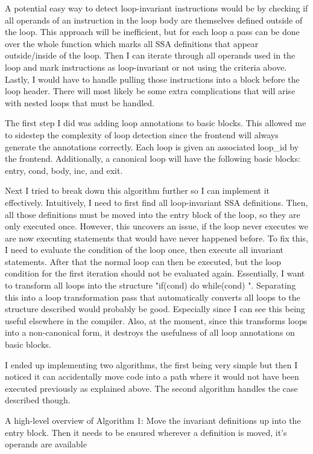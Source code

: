 \documentclass[11pt, a4paper, titlepage]{article}
\begin{document}
A potential easy way to detect loop-invariant instructions would be by checking if all operands of an instruction in the loop body are themselves defined outside of the loop. This approach will be inefficient, but for each loop a pass can be done over the whole function which marks all SSA definitions that appear outside/inside of the loop. Then I can iterate through all operands used in the loop and mark instructions as loop-invariant or not using the criteria above. Lastly, I would have to handle pulling those instructions into a block before the loop header. There will most likely be some extra complications that will arise with nested loops that must be handled.

The first step I did was adding loop annotations to basic blocks.
This allowed me to sidestep the complexity of loop detection since the frontend will always generate the annotations correctly.
Each loop is given an associated loop\_id by the frontend.
Additionally, a canonical loop will have the following basic blocks: entry, cond, body, inc, and exit.

Next I tried to break down this algorithm further so I can implement it effectively. Intuitively, I need to first find all loop-invariant SSA definitions. Then, all those definitions must be moved into the entry block of the loop, so they are only executed once. However, this uncovers an issue, if the loop never executes we are now executing statements that would have never happened before. To fix this, I need to evaluate the condition of the loop once, then execute all invariant statements. After that the normal loop can then be executed, but the loop condition for the first iteration should not be evaluated again. Essentially, I want to transform all loops into the structure "if(cond) { do {} while(cond) }". Separating this into a loop transformation pass that automatically converts all loops to the structure described would probably be good. Especially since I can see this being useful elsewhere in the compiler. Also, at the moment, since this transforms loops into a non-canonical form, it destroys the usefulness of all loop annotations on basic blocks.

I ended up implementing two algorithms, the first being very simple but then I noticed it can accidentally move code into a path where it would not have been executed previously as explained above. The second algorithm handles the case described though.

A high-level overview of Algorithm 1: Move the invariant definitions up into the entry block. Then it needs to be ensured wherever a definition is moved, it's operands are available
\end{document}
